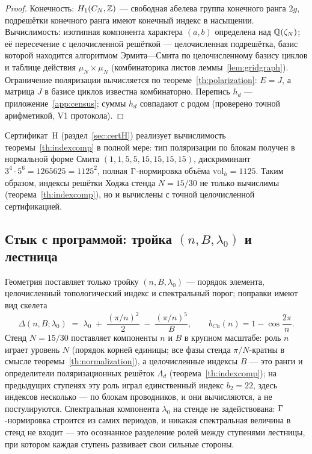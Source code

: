 \begin{proof}
Конечность: $H_1(C_N,\mathbb{Z})$ --- свободная абелева группа конечного
ранга $2g$, подрешётки конечного ранга имеют конечный индекс в
насыщении. Вычислимость: изотипная компонента характера $(a,b)$
определена над $\mathbb{Q}(\zeta_N)$; её пересечение с целочисленной
решёткой --- целочисленная подрешётка, базис которой находится
алгоритмом Эрмита---Смита по целочисленному базису циклов и таблице
действия $\mu_N\times\mu_N$ (комбинаторика листов
леммы~\ref{lem:gridgraph}). Ограничение поляризации вычисляется по
теореме~\ref{th:polarization}: $E=J$, а матрица $J$ в базисе циклов
известна комбинаторно. Перепись $h_d$ ---
приложение~\ref{app:census}; суммы $h_d$ совпадают с родом (проверено
точной арифметикой, V1 протокола).
\end{proof}

\begin{statusbox}
Сертификат~H (раздел~\ref{sec:certH}) реализует вычислимость
теоремы~\ref{th:indexcomp} в полной мере: тип поляризации по блокам
получен в нормальной форме Смита $(1,1,5,5,15,15,15,15)$,
дискриминант $3^4\cdot5^6=1265625=1125^2$, полная $\Gamma$-нормировка
объёма $\mathrm{vol}_h=1125$. Таким образом, индексы решётки Ходжа
стенда $N=15/30$ не только вычислимы (теорема~\ref{th:indexcomp}),
но и вычислены с точной целочисленной сертификацией.
\end{statusbox}

\subsection{Стык с программой: тройка $(n,B,\lambda_0)$ и лестница}
\label{sec:repocycle}

Геометрия поставляет только тройку $(n,B,\lambda_0)$ --- порядок
элемента, целочисленный топологический индекс и спектральный порог;
поправки имеют вид скелета
\[
  \Delta(n,B;\lambda_0) \;=\; \lambda_0
  \;+\;\frac{(\pi/n)^2}{2}\;-\;\frac{(\pi/n)^5}{B},
  \qquad
  b_{Ch}(n)=1-\cos\frac{2\pi}{n}.
\]
Стенд $N=15/30$ поставляет компоненты $n$ и $B$ в крупном масштабе:
роль $n$ играет уровень $N$ (порядок корней единицы; все фазы стенда
$\pi/N$-кратны в смысле теоремы~\ref{th:normalization}), а
целочисленные индексы $B$ --- это ранги и определители
поляризационных решёток $\Lambda_d$ (теорема~\ref{th:indexcomp});
на предыдущих ступенях эту роль играл единственный индекс $b_2=22$,
здесь индексов несколько --- по блокам проводников, и они
вычисляются, а не постулируются. Спектральная компонента $\lambda_0$
на стенде не задействована: $\Gamma$-нормировка строится из самих
периодов, и никакая спектральная величина в стенд не входит --- это
осознанное разделение ролей между ступенями лестницы, при котором
каждая ступень развивает свои сильные стороны.
